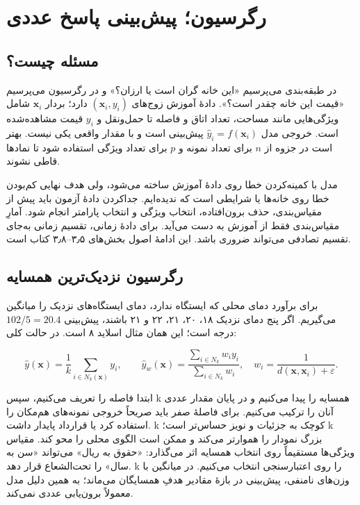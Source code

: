 \chapter{رگرسیون؛ پیش‌بینی پاسخ عددی}
\section{مسئله چیست؟}

در طبقه‌بندی می‌پرسیم «این خانه گران است یا ارزان؟» و در رگرسیون می‌پرسیم «قیمت این خانه چقدر است؟». دادهٔ آموزش زوج‌های \((\boldsymbol{x}_i,y_i)\) دارد؛ بردار \(\boldsymbol{x}_i\) شامل ویژگی‌هایی مانند مساحت، تعداد اتاق و فاصله تا حمل‌ونقل و \(y_i\) قیمت مشاهده‌شده است. خروجی مدل \(\widehat y_i=f(\boldsymbol{x}_i)\) پیش‌بینی است و با مقدار واقعی یکی نیست. بهتر است در جزوه از \(n\) برای تعداد نمونه و \(p\) برای تعداد ویژگی استفاده شود تا نمادها قاطی نشوند.

مدل با کمینه‌کردن خطا روی دادهٔ آموزش ساخته می‌شود، ولی هدف نهایی کم‌بودن خطا روی خانه‌ها یا شرایطی است که ندیده‌ایم. جداکردن دادهٔ آزمون باید پیش از مقیاس‌بندی، حذف برون‌افتاده، انتخاب ویژگی و انتخاب پارامتر انجام شود. آمارِ مقیاس‌بندی فقط از آموزش به دست می‌آید. برای دادهٔ زمانی، تقسیم زمانی به‌جای تقسیم تصادفی می‌تواند ضروری باشد. این ادامهٔ اصول بخش‌های ۳٫۵--۳٫۸ کتاب است.

\section{رگرسیون نزدیک‌ترین همسایه}

برای برآورد دمای محلی که ایستگاه ندارد، دمای ایستگاه‌های نزدیک را میانگین می‌گیریم. اگر پنج دمای نزدیک ۱۸، ۲۰، ۲۱، ۲۲ و ۲۱ باشند، پیش‌بینی \(102/5=20.4\) درجه است؛ این همان مثال اسلاید ۸ است. در حالت کلی:

\[
\widehat y(\boldsymbol{x})=\frac1k\sum_{i\in N_k(\boldsymbol{x})}y_i,
\qquad
\widehat y_w(\boldsymbol{x})=\frac{\sum_{i\in N_k}w_i y_i}{\sum_{i\in N_k}w_i},
\quad w_i=\frac1{d(\boldsymbol{x},\boldsymbol{x}_i)+\varepsilon}.
\]

ابتدا فاصله را تعریف می‌کنیم، سپس k همسایه را پیدا می‌کنیم و در پایان مقدار عددی آنان را ترکیب می‌کنیم. برای فاصلهٔ صفر باید صریحاً خروجی نمونه‌های هم‌مکان را استفاده کرد یا قرارداد پایدار داشت. k کوچک به جزئیات و نویز حساس‌تر است؛ k بزرگ نمودار را هموارتر می‌کند و ممکن است الگوی محلی را محو کند. مقیاس ویژگی‌ها مستقیماً روی انتخاب همسایه اثر می‌گذارد: «حقوق به ریال» می‌تواند «سن به سال» را تحت‌الشعاع قرار دهد. k را روی اعتبارسنجی انتخاب می‌کنیم. در میانگین با وزن‌های نامنفی، پیش‌بینی در بازهٔ مقادیر هدفِ همسایگان می‌ماند؛ به همین دلیل مدل معمولاً برون‌یابی عددی نمی‌کند.

